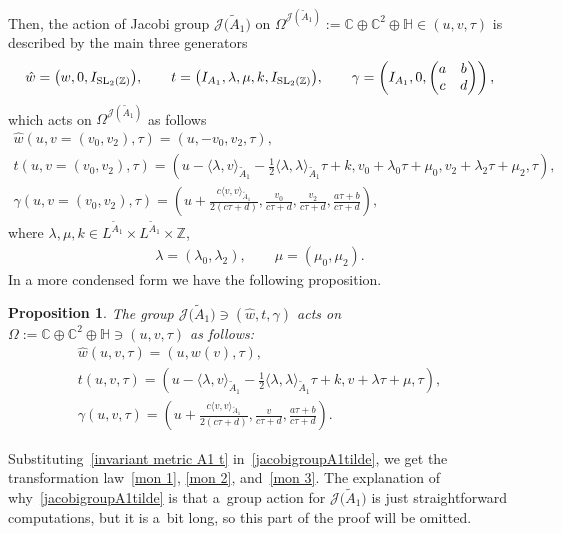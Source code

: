 \documentclass[pdftex]{sigma}%
\numberwithin{equation}{section}
\newtheorem{Proposition}[Theorem]{Proposition}
 { \theoremstyle{definition}
\newtheorem{Definition}[Theorem]{Definition}
\newtheorem{Remark}[Theorem]{Remark} }
\newcommand{\Ja}{\mathcal{J}}
\begin{document}
Then, the action of Jacobi group $\Ja\big(\tilde A_1\big)$ on $\Omega^{\Ja(\tilde A_1)}:=\mathbb{C}\oplus \mathbb{C}^{2}\oplus \mathbb{H} \in (u,v,\tau)$ is described by the main three generators
\begin{gather*}
\hat w=\big(w,0,I_{{\rm SL}_2(\mathbb{Z})}\big),\qquad
 t=\big(I_{A_1},\lambda,\mu,k,I_{{\rm SL}_2(\mathbb{Z})}\big),\qquad
\gamma=\left(I_{A_1},0,\begin{pmatrix}
a & b \\c & d\\\end{pmatrix}\right),
\end{gather*}
 which acts on $\Omega^{\Ja(\tilde A_1)}$ as follows
\begin{gather*}
\hat w(u,v=(v_0,v_2),\tau)= (u,-v_0,v_2,\tau ),
\\[-.5ex]
t(u,v=(v_0,v_2),\tau)=\left(u-\langle \lambda,v \rangle_{\tilde A_1}-\frac{1}{2}\langle \lambda,\lambda \rangle_{\tilde A_1}\tau+k,v_0+\lambda_0\tau+\mu_0,v_2+\lambda_2\tau+\mu_2,\tau\right),
\\[-.5ex]
\gamma(u,v=(v_0,v_2),\tau)=\left(u+\frac{c\langle v,v \rangle_{\tilde A_1}}{2(c\tau+d)},\frac{v_0}{c\tau+d},\frac{v_2}{c\tau+d},\frac{a\tau+b}{c\tau+d}\right),
\end{gather*}
where $\lambda,\mu, k \in L^{\tilde A_1}\times L^{\tilde A_1}\times \mathbb{Z}$,
\begin{gather*}
\lambda=(\lambda_0,\lambda_2), \qquad \mu=(\mu_0,\mu_2).
\end{gather*}
In a more condensed form we have the following proposition.
\begin{Proposition}
The group $\Ja\big(\tilde A_1\big)\ni (\hat w,t,\gamma)$ acts on $\Omega:=\mathbb{C}\oplus \mathbb{C}^{2}\oplus \mathbb{H} \ni (u,v,\tau)$ as follows:
\begin{gather}
\hat w(u,v,\tau)=(u,w(v),\tau),\nonumber
\\[-.5ex]
t(u,v,\tau)=\left(u-\langle \lambda,v \rangle_{\tilde A_1}-\frac{1}{2}\langle \lambda,\lambda \rangle_{\tilde A_1}\tau+k,v+\lambda\tau+\mu,\tau\right),\nonumber
\\[-.5ex]
\gamma(u,v,\tau)=\left(u+\frac{c\langle v,v \rangle_{\tilde A_1}}{2(c\tau+d)},\frac{v}{c\tau+d},\frac{a\tau+b}{c\tau+d}\right).
\label{jacobigroupA1tilde}
\end{gather}
\end{Proposition}

Substituting~\eqref{invariant metric A1 t} in~\eqref{jacobigroupA1tilde}, we get the transformation law~\eqref{mon 1}, \eqref{mon 2}, and~\eqref{mon 3}. The explanation of why~\eqref{jacobigroupA1tilde} is that a~group action for $\Ja\big(\tilde A_1\big)$ is just straightforward computations, but it is a~bit long, so this part of the proof will be omitted.
\end{document}
